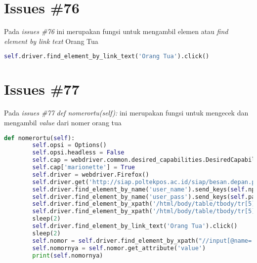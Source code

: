 \section{Issues \#76}
Pada \textit{issues \#76} ini merupakan fungsi untuk mengambil elemen atau \textit{find element by link text} Orang Tua
\begin{lstlisting}[language=Python]
self.driver.find_element_by_link_text('Orang Tua').click()
\end{lstlisting}


\section{Issues \#77}
Pada \textit{issues \#77} \textit{def nomerortu(self):} ini merupakan fungsi untuk mengecek dan mengambil \textit{value} dari nomer orang tua
\begin{lstlisting}[language=Python]
 def nomerortu(self):
        self.opsi = Options()
        self.opsi.headless = False
        self.cap = webdriver.common.desired_capabilities.DesiredCapabilities().FIREFOX
        self.cap['marionette'] = True
        self.driver = webdriver.Firefox()
        self.driver.get('http://siap.poltekpos.ac.id/siap/besan.depan.php')
        self.driver.find_element_by_name('user_name').send_keys(self.npm)
        self.driver.find_element_by_name('user_pass').send_keys(self.paswd)
        self.driver.find_element_by_xpath('/html/body/table/tbody/tr[5]/td/table[1]/tbody/tr/td[2]/table[2]/tbody/tr[1]/td[2]/div/form/input[4]').click()
        self.driver.find_element_by_xpath('/html/body/table/tbody/tr[5]/td/table[1]/tbody/tr/td[1]/table[2]/tbody/tr[1]/td[2]/a[1]').click()
        sleep(2)
        self.driver.find_element_by_link_text('Orang Tua').click()
        sleep(2)
        self.nomor = self.driver.find_element_by_xpath("//input[@name='HandphoneOrtu']")
        self.nomornya = self.nomor.get_attribute('value')
        print(self.nomornya)
\end{lstlisting}

